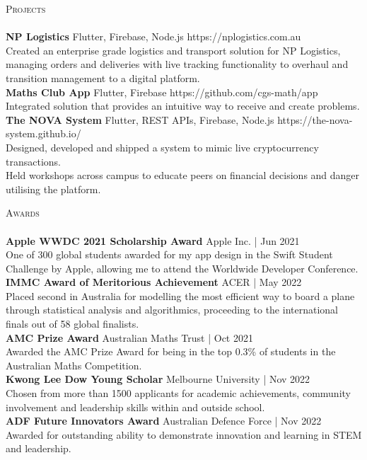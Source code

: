 \documentclass[a4paper]{article}
\newcommand{\lineunder} {
    \vspace*{-8pt} \\
    \hspace*{-18pt} \hrulefill \\
}
\newcommand{\header} [1] {
    {\hspace*{-18pt}\vspace*{6pt} \textsc{#1}}
    \vspace*{-6pt} \lineunder
}
\begin{document}
\header{Projects}
{\textbf{NP Logistics}} {\textsl{\hfill} Flutter, Firebase, Node.js}  https://nplogistics.com.au\\
Created an enterprise grade logistics and transport solution for NP Logistics, managing orders and deliveries with live tracking functionality to overhaul and transition management to a digital platform.\\
\vspace*{2mm}
{\textbf{Maths Club App}} {\textsl{\hfill} Flutter, Firebase}  https://github.com/cgs-math/app\\
Integrated solution that provides an intuitive way to receive and create problems.\\
\vspace*{2mm}
{\textbf{The NOVA System}} {\textsl{\hfill} Flutter, REST APIs, Firebase, Node.js}  https://the-nova-system.github.io/\\
Designed, developed and shipped a system to mimic live cryptocurrency transactions.\\
Held workshops across campus to educate peers on financial decisions and danger utilising the platform.\\
\vspace*{2mm}

\header{Awards}
\textbf{Apple WWDC 2021 Scholarship Award} \hfill Apple Inc. | Jun 2021\\
One of 300 global students awarded for my app design in the Swift Student Challenge by Apple, allowing me to attend the Worldwide Developer Conference.\\
\vspace*{2mm}
\textbf{IMMC Award of Meritorious Achievement} \hfill ACER | May 2022\\
Placed second in Australia for modelling the most efficient way to board a plane through statistical analysis and algorithmics, proceeding to the international finals out of 58 global finalists.\\
\vspace*{2mm}
\textbf{AMC Prize Award} \hfill Australian Maths Trust | Oct 2021\\
Awarded the AMC Prize Award for being in the top 0.3\% of students in the Australian Maths Competition.\\
\vspace*{2mm}
\textbf{Kwong Lee Dow Young Scholar} \hfill Melbourne University | Nov 2022\\
Chosen from more than 1500 applicants for academic achievements, community involvement and leadership skills within and outside school.\\
\vspace*{2mm}
\textbf{ADF Future Innovators Award} \hfill Australian Defence Force | Nov 2022\\
Awarded for outstanding ability to demonstrate innovation and learning in STEM and leadership.\\
\vspace*{2mm}
\end{document}
